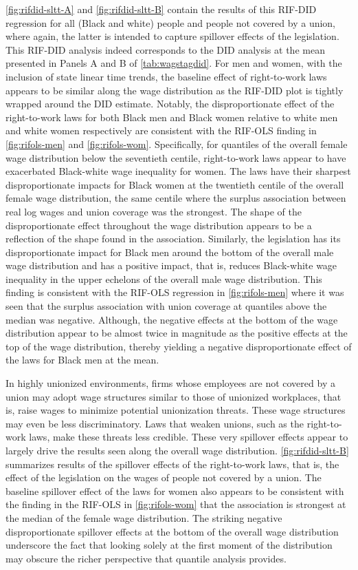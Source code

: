 \documentclass[11pt]{article}
\begin{document}
\autoref{fig:rifdid-sltt-A} and \autoref{fig:rifdid-sltt-B} contain the results of this RIF-DID regression for all (Black and white) people and people not covered by a union, where again, the latter is intended to capture spillover effects of the legislation. This RIF-DID analysis indeed corresponds to the DID analysis at the mean presented in Panels A and B of \autoref{tab:wagstagdid}. For men and women, with the inclusion of state linear time trends, the baseline effect of right-to-work laws appears to be similar along the wage distribution as the RIF-DID plot is tightly wrapped around the DID estimate. Notably, the disproportionate effect of the right-to-work laws for both Black men and Black women relative to white men and white women respectively are consistent with the RIF-OLS finding in \autoref{fig:rifols-men} and \autoref{fig:rifols-wom}. Specifically, for quantiles of the overall female wage distribution below the seventieth centile, right-to-work laws appear to have exacerbated Black-white wage inequality for women. The laws have their sharpest disproportionate impacts for Black women at the twentieth centile of the overall female wage distribution, the same centile where the surplus association between real log wages and union coverage was the strongest. The shape of the disproportionate effect throughout the wage distribution appears to be a reflection of the shape found in the association. Similarly, the legislation has its disproportionate impact for Black men around the bottom of the overall male wage distribution and has a positive impact, that is, reduces Black-white wage inequality in the upper echelons of the overall male wage distribution. This finding is consistent with the RIF-OLS regression in \autoref{fig:rifols-men} where it was seen that the surplus association with union coverage at quantiles above the median was negative. Although, the negative effects at the bottom of the wage distribution appear to be almost twice in magnitude as the positive effects at the top of the wage distribution, thereby yielding a negative disproportionate effect of the laws for Black men at the mean. 

In highly unionized environments, firms whose employees are not covered by a union may adopt wage structures similar to those of unionized workplaces, that is, raise wages to minimize potential unionization threats. These wage structures may even be less discriminatory. Laws that weaken unions, such as the right-to-work laws, make these threats less credible. These very spillover effects appear to largely drive the results seen along the overall wage distribution. \autoref{fig:rifdid-sltt-B} summarizes results of the spillover effects of the right-to-work laws, that is, the effect of the legislation on the wages of people not covered by a union. The baseline spillover effect of the laws for women also appears to be consistent with the finding in the RIF-OLS in \autoref{fig:rifols-wom} that the association is strongest at the median of the female wage distribution. The striking negative disproportionate spillover effects at the bottom of the overall wage distribution underscore the fact that looking solely at the first moment of the distribution may obscure the richer perspective that quantile analysis provides. 
\end{document}
